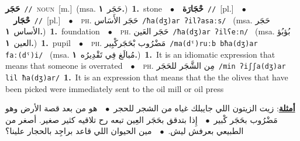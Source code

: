 \documentclass[10pt,a4paper,twoside]{article} %
\begin{document}
\begin{multicols}{2}
{\setlength\topsep{0pt}\textbf{\foreignlanguage{arabic}{حَجَر}}\ {\color{gray}\texttt{//}\color{black}}\ \textsc{noun}\ [m.]\ \color{gray}(msa. \foreignlanguage{arabic}{حَجَر}~\foreignlanguage{arabic}{\textbf{١.}})\color{black}\ \textbf{1.}~stone\ \ $\bullet$\ \ \setlength\topsep{0pt}\textbf{\foreignlanguage{arabic}{حْجَارَة}}\ {\color{gray}\texttt{//}\color{black}}\ [pl.]\ \ $\bullet$\ \ \setlength\topsep{0pt}\textbf{\foreignlanguage{arabic}{حْجَار}}\ {\color{gray}\texttt{//}\color{black}}\ [pl.]\ \ $\bullet$\ \ \textsc{ph.} \color{gray} \foreignlanguage{arabic}{حَجَر الأَسَاس}\color{black}\ {\color{gray}\texttt{/{\sffamily ħa(dʒ)ar ʔilʔasaːs}/}\color{black}}\ \color{gray} (msa. \foreignlanguage{arabic}{حَجَر الأساس}~\foreignlanguage{arabic}{\textbf{١.}})\color{black}\ \textbf{1.}~foundation\ \ $\bullet$\ \ \textsc{ph.} \color{gray} \foreignlanguage{arabic}{حَجَر العَين}\color{black}\ {\color{gray}\texttt{/{\sffamily ħa(dʒ)ar ʔilʕeːn}/}\color{black}}\ \color{gray} (msa. \foreignlanguage{arabic}{بُؤبُؤ العين}~\foreignlanguage{arabic}{\textbf{١.}})\color{black}\ \textbf{1.}~pupil\ \ $\bullet$\ \ \textsc{ph.} \color{gray} \foreignlanguage{arabic}{مَضْرُوب بْحَجَركْبِير}\color{black}\ {\color{gray}\texttt{/{\sffamily ma(dˤ)ruːb bħa(dʒ)ar faː(dˤ)i}/}\color{black}}\ \color{gray} (msa. \foreignlanguage{arabic}{مُبالَغ فِي تَقْدِيرُه}~\foreignlanguage{arabic}{\textbf{١.}})\color{black}\ \textbf{1.}~It is an idiomatic expression that means that someone is overrated\ \ $\bullet$\ \ \textsc{ph.} \color{gray} \foreignlanguage{arabic}{مِن الشَّجَر للحَجَر}\color{black}\ {\color{gray}\texttt{/{\sffamily min ʔiʃʃa(dʒ)ar lil ħa(dʒ)ar}/}\color{black}}\ \textbf{1.}~It is an expression that means that the the olives that have been picked were immediately sent to the oil mill or oil press\  \begin{flushright}\color{gray}\foreignlanguage{arabic}{\textbf{\underline{\foreignlanguage{arabic}{أمثلة}}}: زيت الزيتون اللي جايبلك غياه من الشجر للحجر\ $\bullet$\ \  هو من بعد قصة الأرض وهو مَضْرُوب بحَجَر كْبير\ $\bullet$\ \  إِذا بتدقق بحَجَر العِين تبعه رح تلاقيه كثير صغير. أصغر من الطبيعي بعرفش ليش.\ $\bullet$\ \  مين الحيوان اللي قاعد براجِد بالحجار علينا؟}\end{flushright}\color{black}} \vspace{2mm}


\end{multicols}
\end{document}
